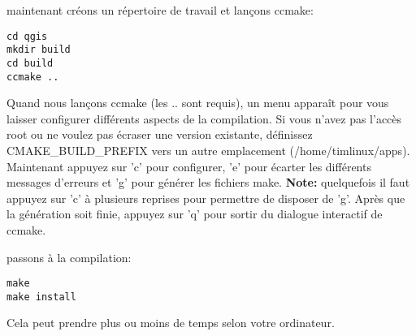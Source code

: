 maintenant créons un répertoire de travail et lançons ccmake:

\begin{verbatim}
cd qgis
mkdir build
cd build
ccmake ..
\end{verbatim}

Quand nous lançons ccmake (les .. sont requis), un menu apparaît pour vous laisser configurer différents aspects de la compilation. Si vous n'avez pas l'accès root ou ne voulez pas écraser une version existante, définissez CMAKE\_BUILD\_PREFIX vers un autre emplacement (/home/timlinux/apps). Maintenant appuyez sur 'c' pour configurer, 'e' pour écarter les différents messages d'erreurs et 'g' pour générer les fichiers make. \textbf{Note:} quelquefois il faut appuyez sur 'c' à plusieurs reprises pour permettre de disposer de 'g'.
Après que la génération soit finie, appuyez sur 'q' pour sortir du dialogue interactif de ccmake.

passons à la compilation:

\begin{verbatim}
make
make install
\end{verbatim}

Cela peut prendre plus ou moins de temps selon votre ordinateur.

% 
% 
% 
% 
% 
% 
% 
% 

